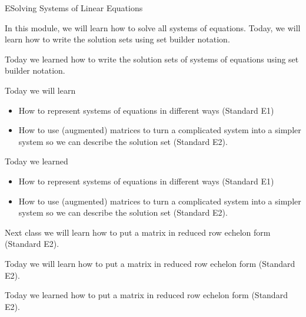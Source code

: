 \begin{module}{E}{Solving Systems of Linear Equations}









\newModuleSection
\begin{goals}
In this module, we will learn how to solve all systems of equations. Today, we will learn how to write the solution sets using set builder notation.
\end{goals}
\begin{summary}
Today we learned how to write the solution sets of systems of equations using set builder notation.
\end{summary}

\newModuleSection
\begin{goals}
Today we will learn
\begin{itemize}
\item How to represent systems of equations in different ways (Standard E1)
\item How to use (augmented) matrices to turn a complicated system into a simpler system so we can describe the solution set (Standard E2).
\end{itemize}
\end{goals}
\begin{summary}
Today we learned
\begin{itemize}
\item How to represent systems of equations in different ways (Standard E1)
\item How to use (augmented) matrices to turn a complicated system into a simpler system so we can describe the solution set (Standard E2).
\end{itemize}
\vfill
Next class we will learn how to put a matrix in reduced row echelon form (Standard E2).
\end{summary}

\newModuleSection
\begin{goals}
Today we will learn how to put a matrix in reduced row echelon form (Standard E2).
\end{goals}
\begin{summary}
Today we learned how to put a matrix in reduced row echelon form (Standard E2).
\end{summary}


\end{module}

